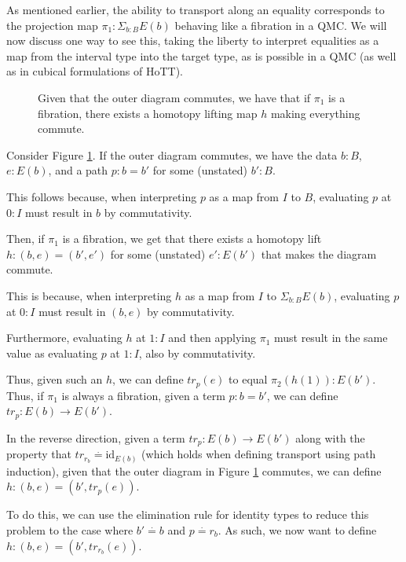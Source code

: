 \documentclass{amsart}
\theoremstyle{definition}
\newcommand{\defeq}{\ensuremath{\overset{\boldsymbol{\cdot}}{=}}}
\begin{document}
As mentioned earlier, the ability to transport along an equality corresponds to the projection map $\pi_1 : \Sigma_{b : B} E(b)$ behaving like a fibration in a QMC. We will now discuss one way to see this, taking the liberty to interpret equalities as a map from the interval type into the target type, as is possible in a QMC (as well as in cubical formulations of HoTT).

\begin{figure}[h]
    \centering
    
    \caption{Given that the outer diagram commutes, we have that if $\pi_1$ is a fibration, there exists a homotopy lifting map $h$ making everything commute.}
    \label{fig:transport-as-fibration}
\end{figure}

Consider Figure \ref{fig:transport-as-fibration}. If the outer diagram commutes, we have the data $b : B$, $e : E(b)$, and a path $p : b = b'$ for some (unstated) $b' : B$.

This follows because, when interpreting $p$ as a map from $I$ to $B$, evaluating $p$ at $0 : I$ must result in $b$ by commutativity.

Then, if $\pi_1$ is a fibration, we get that there exists a homotopy lift $h : (b, e) = (b', e')$ for some (unstated) $e' : E(b')$ that makes the diagram commute.

This is because, when interpreting $h$ as a map from $I$ to $\Sigma_{b : B} E(b)$, evaluating $p$ at $0 : I$ must result in $(b, e)$ by commutativity.

Furthermore, evaluating $h$ at $1 : I$ and then applying $\pi_1$ must result in the same value as evaluating $p$ at $1 : I$, also by commutativity.

Thus, given such an $h$, we can define $tr_p (e)$ to equal $\pi_2 (h (1)) : E(b')$. Thus, if $\pi_1$ is always a fibration, given a term $p : b = b'$, we can define $tr_p : E(b) \to E(b')$.

In the reverse direction, given a term $tr_p : E(b) \to E(b')$ along with the property that $tr_{r_b} \defeq \text{id}_{E(b)}$ (which holds when defining transport using path induction), given that the outer diagram in Figure \ref{fig:transport-as-fibration} commutes, we can define $h : (b, e) = (b', tr_p (e))$.

To do this, we can use the elimination rule for identity types to reduce this problem to the case where $b' \defeq b$ and $p \defeq r_b$. As such, we now want to define $h : (b, e) = (b', tr_{r_b} (e))$.
\end{document}
